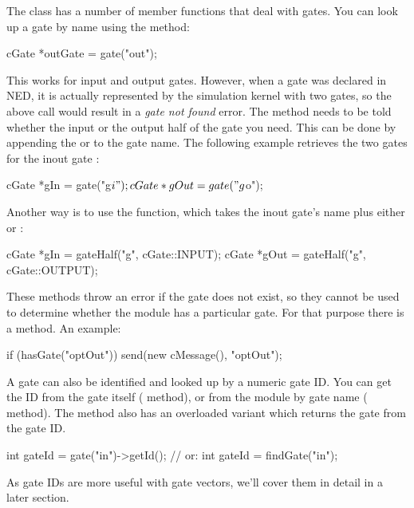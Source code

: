 \begin{ned}
The  class has a number of member functions that
deal with gates. You can look up a gate by name using the 
method:

\begin{cpp}
cGate *outGate = gate("out");
\end{cpp}

This works for input and output gates. However, when a gate was declared
 in NED, it is actually represented by the simulation kernel
with two gates, so the above call would result in a \textit{gate not found}
error. The  method needs to be told whether the input or
the output half of the gate you need. This can be done by appending
the  or  to the gate name. The following example
retrieves the two gates for the inout gate :

\begin{cpp}
cGate *gIn = gate("g$i");
cGate *gOut = gate("g$o");
\end{cpp}

Another way is to use the  function, which takes
the inout gate's name plus either  or :

\begin{cpp}
cGate *gIn = gateHalf("g", cGate::INPUT);
cGate *gOut = gateHalf("g", cGate::OUTPUT);
\end{cpp}

These methods throw an error if the gate does not exist, so they cannot
be used to determine whether the module has a particular gate.
For that purpose there is a  method. An example:

\begin{cpp}
if (hasGate("optOut"))
   send(new cMessage(), "optOut");
\end{cpp}

A gate can also be identified and looked up by a numeric gate ID.
You can get the ID from the gate itself ( method),
or from the module by gate name ( method).
The  method also has an overloaded variant which
returns the gate from the gate ID.

\begin{cpp}
int gateId = gate("in")->getId();  // or:
int gateId = findGate("in");
\end{cpp}

As gate IDs are more useful with gate vectors, we'll cover them
in detail in a later section.



\end{ned}
